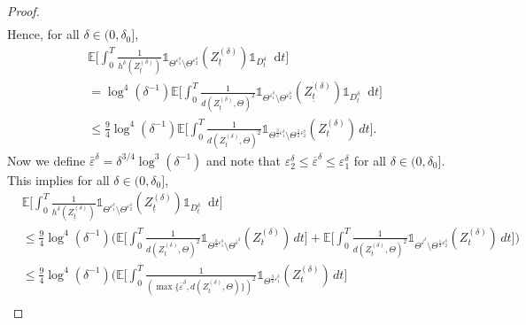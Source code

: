 \documentclass[11pt,a4paper]{article}
\numberwithin{equation}{section}
\theoremstyle{definition}
\newcommand{\E}{{\mathbb{E}}}
\newcommand{\diff}{\mathop{}\!\mathrm{d}}
\begin{document}
\begin{proof}
\begin{equation}
\begin{aligned}
        \end{aligned}
    \end{equation}     
    Hence, for all $\delta\in(0,\delta_0]$,
    \begin{equation}\label{eq:Cost8}
        \begin{aligned}
            &\E\Big[ \int_0^T  \frac{1}{h^\delta(Z^{(\delta)}_{\underline t})} \mathds{1}_{\Theta^{\varepsilon_1^\delta}\setminus\Theta^{\varepsilon_2^\delta} }(Z^{(\delta)}_{\underline t})\mathds{1}_{D_t^{\delta}} \diff t\Big]\\
            &= \log^4(\delta^{-1}) \E\Big[\int_0^T \frac{1}{d(Z^{(\delta)}_{\underline t}, \Theta)^2}\mathds{1}_{\Theta^{\varepsilon_1^\delta}\setminus\Theta^{\varepsilon_2^\delta} }(Z^{(\delta)}_{\underline t})\mathds{1}_{D_t^{\delta}} \diff t\Big]\\
             &\leq \frac{9}{4}  \log^4(\delta^{-1}) \E\Big[\int_0^T\frac{1}{d(Z^{(\delta)}_{t}, \Theta)^2}\mathds{1}_{ \Theta^{\frac{3}{2}\varepsilon_1^{\delta}}\setminus \Theta^{\frac{1}{2}\varepsilon_2^{\delta}}}(Z^{(\delta)}_{t})\,dt\Bigr].
        \end{aligned}
    \end{equation}  
    Now we define $\bar \varepsilon^\delta = \delta^{3/4}\log^{3}(\delta^{-1})$ and note that $\varepsilon_2^{\delta}\leq \overline\varepsilon^\delta\leq \varepsilon_1^{\delta}$ for all $\delta\in(0, \delta_0]$.
    This implies for all $\delta\in(0,\delta_0]$,
    \begin{equation}\label{eq:Cost9}
        \begin{aligned}
            &\E\Big[ \int_0^T  \frac{1}{h^\delta(Z^{(\delta)}_{\underline t})} \mathds{1}_{\Theta^{\varepsilon_1^\delta}\setminus\Theta^{\varepsilon_2^\delta} }(Z^{(\delta)}_{\underline t})\mathds{1}_{D_t^{\delta}} \diff t\Big]\\
             &\leq \frac{9}{4}  \log^4(\delta^{-1}) \Big(\E\Big[\int_0^T\frac{1}{d(Z^{(\delta)}_{t}, \Theta)^2}\mathds{1}_{ \Theta^{\frac{3}{2}\varepsilon_1^{\delta}}\setminus \Theta^{\bar \varepsilon^{\delta}}}(Z^{(\delta)}_{t})\,dt\Bigr]
             + \E\Big[\int_0^T\frac{1}{d(Z^{(\delta)}_{t}, \Theta)^2}\mathds{1}_{ \Theta^{\bar \varepsilon^{\delta}} \setminus \Theta^{\frac{1}{2}\varepsilon_2^{\delta}}}(Z^{(\delta)}_{t})\,dt\Bigr]\Big)\\
             &\leq \frac{9}{4}  \log^4(\delta^{-1}) \Big( \E\Big[\int_0^T\frac{1}{(\max\{ \bar \varepsilon^{\delta},d(Z^{(\delta)}_{t}, \Theta)\})^2}\mathds{1}_{ \Theta^{\frac{3}{2}\varepsilon_1^{\delta}}}(Z^{(\delta)}_{t})\,dt\Bigr]\\

\end{aligned}
\end{equation}
\end{proof}
\end{document}
